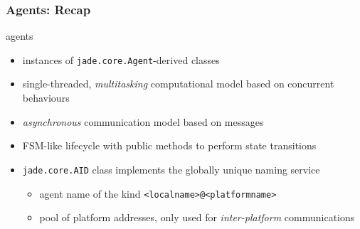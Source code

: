 \documentclass{beamer}\mode<presentation>{\usetheme{AMSCesenaPurpleAndGold}}
\begin{document}
\begin{frame}\frametitle{\jade{} Agents: Recap}
    \begin{block}{\jade{} agents}
        \begin{itemize}
            \item instances of \alert{\texttt{jade.core.Agent}}-derived classes
            \item \alert{single-threaded}, \emph{multitasking} computational model based on concurrent behaviours
            \item \emph{asynchronous} communication model based on \fipa{} \acl{} messages
            \item FSM-like lifecycle with public methods to perform state transitions
            \item \texttt{jade.core.AID} class implements the globally unique naming service
            \begin{itemize}
                \item agent name of the kind \texttt{<localname>@<platformname>}
                \item pool of platform addresses, only used for \emph{inter-platform} communications
            \end{itemize}
        \end{itemize}
    \end{block}
\end{frame}
\end{document}
